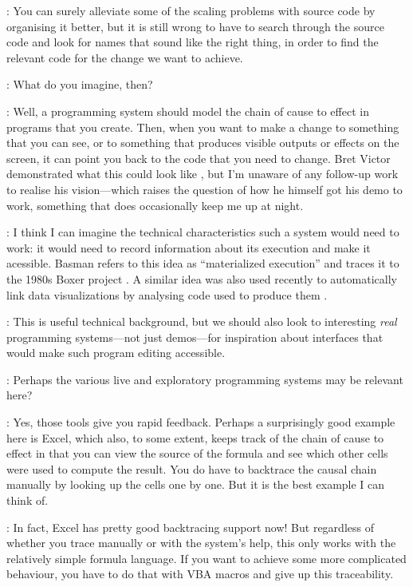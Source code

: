 \documentclass[runningheads]{llncs}
\newcommand{\T}{Tomas}
\newcommand{\J}{Joel}
\newcommand{\says}[2][gg]{\vspace{0.5em}\noindent\hangindent=0.5cm{\textsc{#1}}: #2}
\begin{document}
\says[\J]{You can surely alleviate some of the scaling problems with source code by organising it better, but it is still wrong to have to search through the source code and look for names that sound like the right thing, in order to find the relevant code for the change we want to achieve.}

\says[\T]{What do you imagine, then?}

\says[\J]{Well, a programming system should model the chain of cause to effect in programs that you create. Then, when you want to make a change to something that you can see, or to something that produces visible outputs or effects on the screen, it can point you back to the code that you need to change. Bret Victor demonstrated what this could look like \cite{bret-victor}, but I'm unaware of any follow-up work to realise his vision---which raises the question of how he himself got his demo to work, something that does occasionally keep me up at night.}

\says[\T]{I think I can imagine the technical characteristics such a system would need to work: it would need to record information about its execution and make it acessible. Basman \cite{basman-2022-materialized} refers to this idea as ``materialized execution'' and traces it to the 1980s Boxer project \cite{disessa-1986-boxer}. A similar idea was also used recently to automatically link data visualizations by analysing code used to produce them \cite{perera-2022-galois}.}

\says[\J]{This is useful technical background, but we should also look to interesting \emph{real} programming systems---not just demos---for inspiration about interfaces that would make such program editing accessible.}

\says[\T]{Perhaps the various live and exploratory programming systems \cite{rein-2018-live} may be relevant here?}

\says[\J]{Yes, those tools give you rapid feedback. Perhaps a surprisingly good example here is Excel, which also, to some extent, keeps track of the chain of cause to effect in that you can view the source of the formula and see which other cells were used to compute the result. You do have to backtrace the causal chain manually by looking up the cells one by one. But it is the best example I can think of.}

\says[\T]{In fact, Excel has pretty good backtracing support now! But regardless of whether you trace manually or with the system's help, this only works with the relatively simple formula language. If you want to achieve some more complicated behaviour, you have to do that with VBA macros and give up this traceability. }
\end{document}

